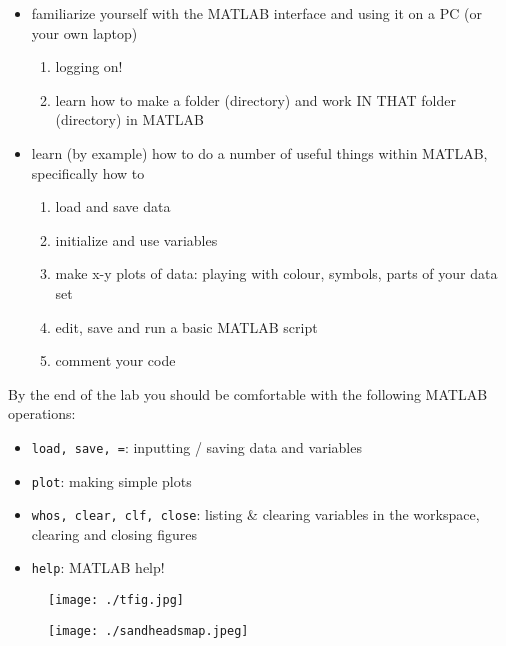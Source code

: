 \documentclass[letterpaper]{article}
\begin{document}
\begin{itemize}
	\item familiarize yourself with the MATLAB interface and using it on a PC (or your own laptop)
	\begin {enumerate}
		\item logging on!
		\item learn how to make a folder (directory) and work IN THAT folder (directory) in MATLAB
	\end {enumerate}

	\item learn (by example) how to do a number of useful things within MATLAB, specifically how to
	\begin {enumerate}
		\item load and save data
		\item initialize and use variables
		\item make x-y plots of data: playing with colour, symbols, parts of your data set
		\item edit, save and run a basic MATLAB script
		\item comment your code
	\end {enumerate}
	
\end {itemize}

  
By the end of the lab you should be comfortable with the following MATLAB operations:

\begin {itemize}
\item \verb+load, save, =+: inputting / saving data and variables
\item \verb+plot+:  making simple plots
\item \verb+whos, clear, clf, close+:  listing \& clearing variables in the workspace, clearing and closing figures
\item \verb+help+:  MATLAB help!

\end {itemize}
 
\begin{figure}[h]
\centering
\texttt{[image: ./tfig.jpg]}
\caption{}
\label{f1}
\end{figure}

\begin{figure}[h]
\centering
\texttt{[image: ./sandheadsmap.jpeg]}
\caption{}
\label{f1}
\end{figure}

\end{document}
